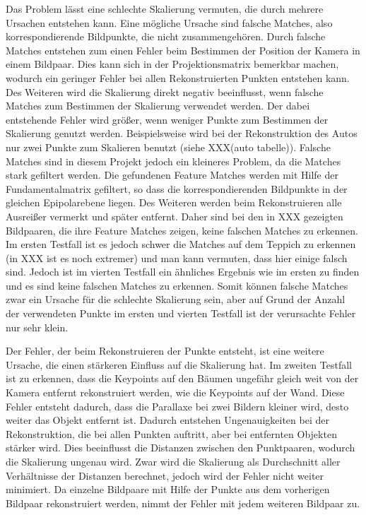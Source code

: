 Das Problem lässt eine schlechte Skalierung vermuten, die durch mehrere Ursachen entstehen kann. 
Eine mögliche Ursache sind falsche Matches, also korrespondierende Bildpunkte, die nicht zusammengehören.
Durch falsche Matches entstehen zum einen Fehler beim Bestimmen der Position der Kamera in einem Bildpaar.
Dies kann sich in der Projektionsmatrix bemerkbar machen, wodurch ein geringer Fehler bei allen Rekonstruierten Punkten entstehen kann.
Des Weiteren wird die Skalierung direkt negativ beeinflusst, wenn falsche Matches zum Bestimmen der Skalierung verwendet werden. 
Der dabei entstehende Fehler wird größer, wenn weniger Punkte zum Bestimmen der Skalierung genutzt werden.
Beispielsweise wird bei der Rekonstruktion des Autos nur zwei Punkte zum Skalieren benutzt (siehe XXX(auto tabelle)).
Falsche Matches sind in diesem Projekt jedoch ein kleineres Problem, da die Matches stark gefiltert werden.
Die gefundenen Feature Matches werden mit Hilfe der Fundamentalmatrix gefiltert, so dass die korrespondierenden Bildpunkte in der gleichen Epipolarebene liegen.
Des Weiteren werden beim Rekonstruieren alle Ausreißer vermerkt und später entfernt.
Daher sind bei den in XXX gezeigten Bildpaaren, die ihre Feature Matches zeigen, keine falschen Matches zu erkennen.
Im ersten Testfall ist es jedoch schwer die Matches auf dem Teppich zu erkennen (in XXX ist es noch extremer) und man kann vermuten, dass hier einige falsch sind.
Jedoch ist im vierten Testfall ein ähnliches Ergebnis wie im ersten zu finden und es sind keine falschen Matches zu erkennen.
Somit können falsche Matches zwar ein Ursache für die schlechte Skalierung sein, aber auf Grund der Anzahl der verwendeten Punkte im ersten und vierten Testfall ist der verursachte Fehler nur sehr klein.

Der Fehler, der beim Rekonstruieren der Punkte entsteht, ist eine weitere Ursache, die einen stärkeren Einfluss auf die Skalierung hat. 
Im zweiten Testfall ist zu erkennen, dass die Keypoints auf den Bäumen ungefähr gleich weit von der Kamera entfernt rekonstruiert werden, wie die Keypoints auf der Wand.
Diese Fehler entsteht dadurch, dass die Parallaxe bei zwei Bildern kleiner wird, desto weiter das Objekt entfernt ist. %
Dadurch entstehen Ungenauigkeiten bei der Rekonstruktion, die bei allen Punkten auftritt, aber bei entfernten Objekten stärker wird. %
Dies beeinflusst die Distanzen zwischen den Punktpaaren, wodurch die Skalierung ungenau wird.
Zwar wird die Skalierung als Durchschnitt aller Verhältnisse der Distanzen berechnet, jedoch wird der Fehler nicht weiter minimiert.
Da einzelne Bildpaare mit Hilfe der Punkte aus dem vorherigen Bildpaar rekonstruiert werden, nimmt der Fehler mit jedem weiteren Bildpaar zu. 

